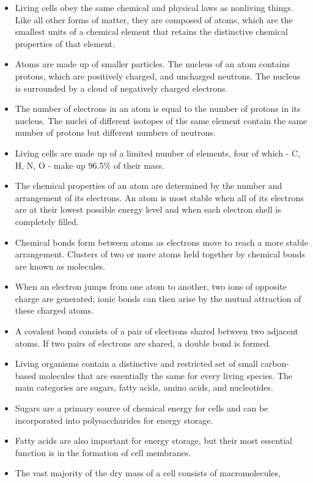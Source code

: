 \begin{itemize}
\item Living cells obey the same chemical and physical laws as nonliving
things. Like all other forms of matter, they are composed of atoms,
which are the smallest units of a chemical element that retains the
distinctive chemical properties of that element.
\item Atoms are made up of smaller particles. The nucleus of an atom
contains protons, which are positively charged, and uncharged neutrons.
The nucleus is surrounded by a cloud of negatively charged
electrons.
\item The number of electrons in an atom is equal to the number of protons
in its nucleus. The nuclei of different isotopes of the same
element contain the same number of protons but different numbers
of neutrons.
\item Living cells are made up of a limited number of elements, four of
which - C, H, N, O - make up 96.5\% of their mass.
\item The chemical properties of an atom are determined by the number
and arrangement of its electrons. An atom is most stable when all of
its electrons are at their lowest possible energy level and when each
electron shell is completely filled.
\item Chemical bonds form between atoms as electrons move to reach
a more stable arrangement. Clusters of two or more atoms held
together by chemical bonds are known as molecules.
\item When an electron jumps from one atom to another, two ions of opposite
charge are generated; ionic bonds can then arise by the mutual
attraction of these charged atoms.
\item A covalent bond consists of a pair of electrons shared between two
adjacent atoms. If two pairs of electrons are shared, a double bond is
formed.
\item Living organisms contain a distinctive and restricted set of small carbon-based
molecules that are essentially the same for every living
species. The main categories are sugars, fatty acids, amino acids,
and nucleotides.
\item Sugars are a primary source of chemical energy for cells and can be
incorporated into polysaccharides for energy storage.
\item Fatty acids are also important for energy storage, but their most
essential function is in the formation of cell membranes.
\item The vast majority of the dry mass of a cell consists of macromolecules,

\end{itemize}

